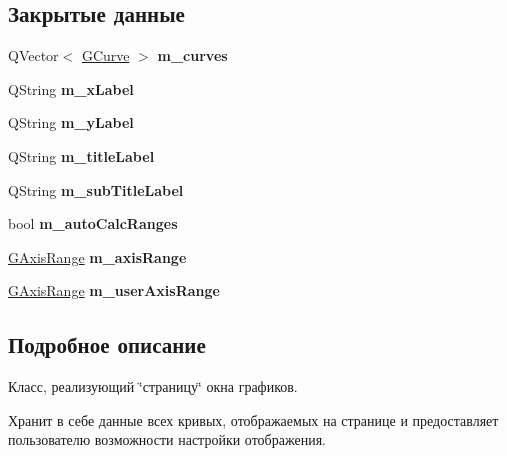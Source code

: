 \subsection*{Закрытые данные}
\begin{DoxyCompactItemize}
\item 
\hypertarget{class_graph_sheet_a970d65cbe6e836277bbf845962c84289}{}\label{class_graph_sheet_a970d65cbe6e836277bbf845962c84289} 
Q\+Vector$<$ \hyperlink{struct_g_curve}{G\+Curve} $>$ {\bfseries m\+\_\+curves}
\item 
\hypertarget{class_graph_sheet_a44b18b8ca129276833d543f0faf70008}{}\label{class_graph_sheet_a44b18b8ca129276833d543f0faf70008} 
Q\+String {\bfseries m\+\_\+x\+Label}
\item 
\hypertarget{class_graph_sheet_a65c42e7ee50cff1b41f200747c99b230}{}\label{class_graph_sheet_a65c42e7ee50cff1b41f200747c99b230} 
Q\+String {\bfseries m\+\_\+y\+Label}
\item 
\hypertarget{class_graph_sheet_a85647d1e1446c66ca9e215db1e3ab9a3}{}\label{class_graph_sheet_a85647d1e1446c66ca9e215db1e3ab9a3} 
Q\+String {\bfseries m\+\_\+title\+Label}
\item 
\hypertarget{class_graph_sheet_aad55c740b2576ea491f66c83695395bb}{}\label{class_graph_sheet_aad55c740b2576ea491f66c83695395bb} 
Q\+String {\bfseries m\+\_\+sub\+Title\+Label}
\item 
\hypertarget{class_graph_sheet_a326acf4c64a807219abbd635482c370c}{}\label{class_graph_sheet_a326acf4c64a807219abbd635482c370c} 
bool {\bfseries m\+\_\+auto\+Calc\+Ranges}
\item 
\hypertarget{class_graph_sheet_a80184036212ce75a2c4799da5032f237}{}\label{class_graph_sheet_a80184036212ce75a2c4799da5032f237} 
\hyperlink{struct_g_axis_range}{G\+Axis\+Range} {\bfseries m\+\_\+axis\+Range}
\item 
\hypertarget{class_graph_sheet_a614acb7954caf3e7c28350d37bc8a6ca}{}\label{class_graph_sheet_a614acb7954caf3e7c28350d37bc8a6ca} 
\hyperlink{struct_g_axis_range}{G\+Axis\+Range} {\bfseries m\+\_\+user\+Axis\+Range}
\end{DoxyCompactItemize}


\subsection{Подробное описание}
Класс, реализующий \char`\"{}страницу\char`\"{} окна графиков. 

Хранит в себе данные всех кривых, отображаемых на странице и предоставляет пользователю возможности настройки отображения.

